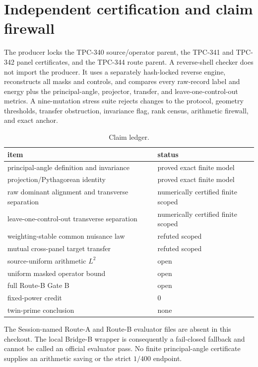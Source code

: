 \documentclass[11pt]{article}
\begin{document}
\section{Independent certification and claim firewall}

The producer locks the TPC-340 source/operator parent, the TPC-341 and
TPC-342 panel certificates, and the TPC-344 route parent.  A reverse-shell
checker does not import the producer.  It uses a separately hash-locked
reverse engine, reconstructs all masks and controls, and compares every
raw-record label and energy plus the principal-angle, projector, transfer,
and leave-one-control-out metrics.  A nine-mutation stress suite rejects
changes to the protocol, geometry thresholds, transfer obstruction,
invariance flag, rank census, arithmetic firewall, and exact anchor.

\begin{table}[ht]
\centering
\caption{Claim ledger.}
\begin{tabular}{ll}
\toprule
item & status\\
\midrule
principal-angle definition and invariance & proved exact finite model\\
projection/Pythagorean identity & proved exact finite model\\
raw dominant alignment and transverse separation & numerically certified finite scoped\\
leave-one-control-out transverse separation & numerically certified finite scoped\\
weighting-stable common nuisance law & refuted scoped\\
mutual cross-panel target transfer & refuted scoped\\
source-uniform arithmetic $L^2$ & open\\
uniform masked operator bound & open\\
full Route-B Gate B & open\\
fixed-power credit & 0\\
twin-prime conclusion & none\\
\bottomrule
\end{tabular}
\end{table}

The Session-named Route-A and Route-B evaluator files are absent in this
checkout.  The local Bridge-B wrapper is consequently a fail-closed fallback
and cannot be called an official evaluator pass.  No finite principal-angle
certificate supplies an arithmetic saving or the strict $1/400$ endpoint.
\end{document}
